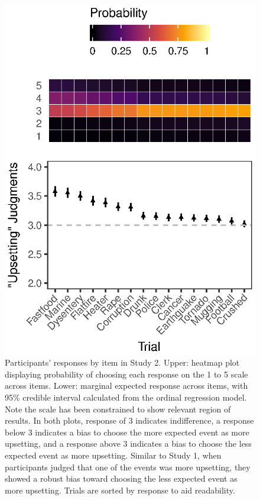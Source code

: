 \documentclass[9pt,twocolumn,twoside,]{pnas-new}
\begin{document}
\begin{figure}
\centering
\includegraphics{fig2.eps}
\caption{Participants' responses by item in Study 2. Upper: heatmap plot
displaying probability of choosing each response on the 1 to 5 scale
across items. Lower: marginal expected response across items, with 95\%
credible interval calculated from the ordinal regression model. Note the
scale has been constrained to show relevant region of results. In both
plots, response of 3 indicates indifference, a response below 3
indicates a bias to choose the more expected event as more upsetting,
and a response above 3 indicates a bias to choose the less expected
event as more upsetting. Similar to Study 1, when participants judged
that one of the events was more upsetting, they showed a robust bias
toward choosing the less expected event as more upsetting. Trials are
sorted by response to aid readability. {}}
\end{figure}
\end{document}
